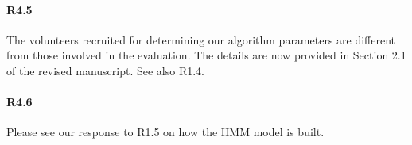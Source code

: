 \paragraph{R4.5} The volunteers recruited for determining our algorithm parameters are different from those involved in the
 evaluation. The details are now provided in Section 2.1 of the revised manuscript. See also R1.4.

 \paragraph{R4.6} Please see our response to R1.5 on how the HMM model is built.
